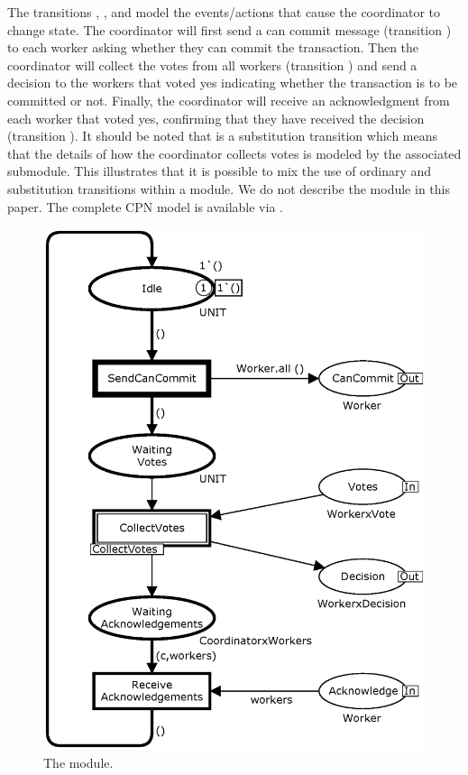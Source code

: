 The transitions , , and
 model the events/actions that cause
the coordinator to change state. The coordinator will first send a can
commit message (transition ) to each worker
asking whether they can commit the transaction. Then the coordinator
will collect the votes from all workers (transition
) and send a decision to the workers that voted
yes indicating whether the transaction is to be committed or
not. Finally, the coordinator will receive an acknowledgment from each
worker that voted yes, confirming that they have received the decision
(transition ).  It should be noted
that  is a substitution transition which means
that the details of how the coordinator collects votes is modeled by
the associated  submodule. This illustrates that
it is possible to mix the use of ordinary and substitution transitions
within a module. We do not describe the  module
in this paper. The complete CPN model is available via \cite{X}.

\begin{figure}[]
\centering
\includegraphics[scale=.5]{figures/Coordinator.eps}
\caption{The  module.}
\label{fig:coordinator}
\end{figure}


